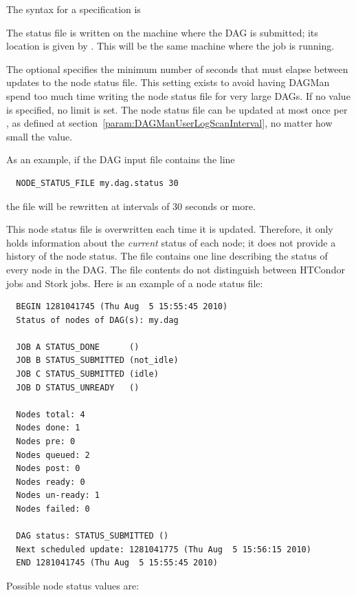 The syntax for a  specification is

  

The status file is written on the machine where the DAG is submitted;
its location is given by .  
This will be the same machine where the  job is running.

The optional  specifies the minimum number of seconds
that must elapse between updates to the node status file.
This setting exists to avoid having DAGMan spend too much time writing
the node status file for very large DAGs.
If no value is specified, no limit is set.
The node status file can be updated at most once
per ,
as defined at section~\ref{param:DAGManUserLogScanInterval},
no matter how small the  value.

As an example, if the DAG input file contains the line
\begin{verbatim}
  NODE_STATUS_FILE my.dag.status 30
\end{verbatim}
the file  will be rewritten at intervals of 30 seconds
or more.

This node status file is overwritten each time it is updated.
Therefore, it only holds information about the \emph{current} status 
of each node; it does not provide a history of the node status.
The file contains one line describing the status of every node in the DAG.
The file contents do not distinguish between HTCondor jobs and Stork jobs.
Here is an example of a node status file:

\begin{verbatim}
  BEGIN 1281041745 (Thu Aug  5 15:55:45 2010)
  Status of nodes of DAG(s): my.dag

  JOB A STATUS_DONE      ()
  JOB B STATUS_SUBMITTED (not_idle)
  JOB C STATUS_SUBMITTED (idle)
  JOB D STATUS_UNREADY   ()

  Nodes total: 4
  Nodes done: 1
  Nodes pre: 0
  Nodes queued: 2
  Nodes post: 0
  Nodes ready: 0
  Nodes un-ready: 1
  Nodes failed: 0

  DAG status: STATUS_SUBMITTED ()
  Next scheduled update: 1281041775 (Thu Aug  5 15:56:15 2010)
  END 1281041745 (Thu Aug  5 15:55:45 2010)
\end{verbatim}

Possible node status values are:

